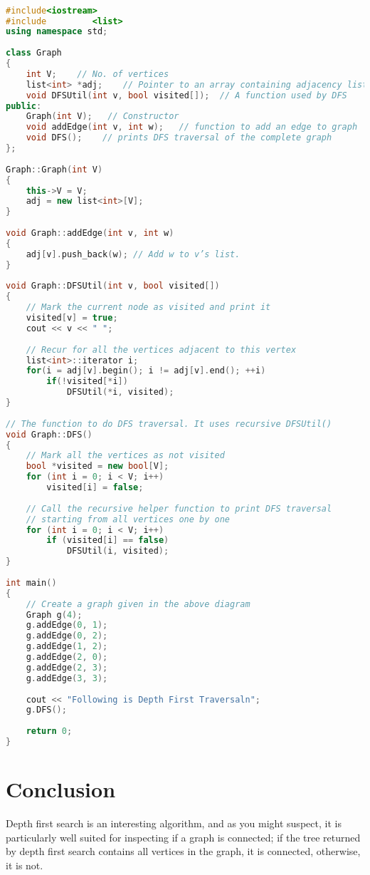 \documentclass[11pt]{article}            %
\begin{document}
\begin{lstlisting}[language=c++]

#include<iostream> 
#include         <list> 
using namespace std; 
  
class Graph 
{ 
    int V;    // No. of vertices 
    list<int> *adj;    // Pointer to an array containing adjacency lists 
    void DFSUtil(int v, bool visited[]);  // A function used by DFS 
public: 
    Graph(int V);   // Constructor 
    void addEdge(int v, int w);   // function to add an edge to graph 
    void DFS();    // prints DFS traversal of the complete graph 
}; 
  
Graph::Graph(int V) 
{ 
    this->V = V; 
    adj = new list<int>[V]; 
} 
  
void Graph::addEdge(int v, int w) 
{ 
    adj[v].push_back(w); // Add w to v’s list. 
} 
  
void Graph::DFSUtil(int v, bool visited[]) 
{ 
    // Mark the current node as visited and print it 
    visited[v] = true; 
    cout << v << " "; 
  
    // Recur for all the vertices adjacent to this vertex 
    list<int>::iterator i; 
    for(i = adj[v].begin(); i != adj[v].end(); ++i) 
        if(!visited[*i]) 
            DFSUtil(*i, visited); 
} 
  
// The function to do DFS traversal. It uses recursive DFSUtil() 
void Graph::DFS() 
{ 
    // Mark all the vertices as not visited 
    bool *visited = new bool[V]; 
    for (int i = 0; i < V; i++) 
        visited[i] = false; 
  
    // Call the recursive helper function to print DFS traversal 
    // starting from all vertices one by one 
    for (int i = 0; i < V; i++) 
        if (visited[i] == false) 
            DFSUtil(i, visited); 
} 
  
int main() 
{ 
    // Create a graph given in the above diagram 
    Graph g(4); 
    g.addEdge(0, 1); 
    g.addEdge(0, 2); 
    g.addEdge(1, 2); 
    g.addEdge(2, 0); 
    g.addEdge(2, 3); 
    g.addEdge(3, 3); 
  
    cout << "Following is Depth First Traversaln"; 
    g.DFS(); 
  
    return 0; 
}


\end{lstlisting}

\section{Conclusion}  
Depth first search is an interesting algorithm, and as you might suspect, it is particularly well suited for inspecting if a graph is connected; if the tree returned by depth first search contains all vertices in the graph, it is connected, otherwise, it is not.

 
\end{document}
